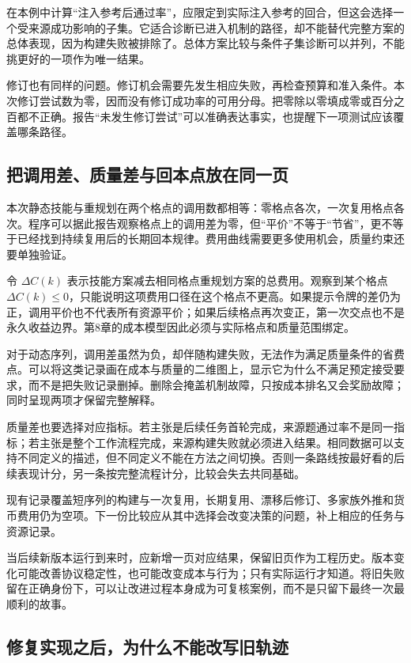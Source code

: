 在本例中计算“注入参考后通过率”，应限定到实际注入参考的回合，但这会选择一个受来源成功影响的子集。它适合诊断已进入机制的路径，却不能替代完整方案的总体表现，因为构建失败被排除了。总体方案比较与条件子集诊断可以并列，不能挑更好的一项作为唯一结果。

修订也有同样的问题。修订机会需要先发生相应失败，再检查预算和准入条件。本次修订尝试数为零，因而没有修订成功率的可用分母。把零除以零填成零或百分之百都不正确。报告“未发生修订尝试”可以准确表达事实，也提醒下一项测试应该覆盖哪条路径。

\subsection{把调用差、质量差与回本点放在同一页}
\label{sec:ch15-costqualitypage}

本次静态技能与重规划在两个格点的调用数都相等：零格点各次，一次复用格点各次。程序可以据此报告观察格点上的调用差为零，但“平价”不等于“节省”，更不等于已经找到持续复用后的长期回本规律。费用曲线需要更多使用机会，质量约束还要单独验证。

令 $\Delta C(k)$ 表示技能方案减去相同格点重规划方案的总费用。观察到某个格点 $\Delta C(k)\leq0$，只能说明这项费用口径在这个格点不更高。如果提示令牌的差仍为正，调用平价也不代表所有资源平价；如果后续格点再次变正，第一次交点也不是永久收益边界。第8章的成本模型因此必须与实际格点和质量范围绑定。

对于动态序列，调用差虽然为负，却伴随构建失败，无法作为满足质量条件的省费点。可以将这类记录画在成本与质量的二维图上，显示它为什么不满足预定接受要求，而不是把失败记录删掉。删除会掩盖机制故障，只按成本排名又会奖励故障；同时呈现两项才保留完整解释。

质量差也要选择对应指标。若主张是后续任务首轮完成，来源题通过率不是同一指标；若主张是整个工作流程完成，来源构建失败就必须进入结果。相同数据可以支持不同定义的描述，但不同定义不能在方法之间切换。否则一条路线按最好看的后续表现计分，另一条按完整流程计分，比较会失去共同基础。

现有记录覆盖短序列的构建与一次复用，长期复用、漂移后修订、多家族外推和货币费用仍为空项。下一份比较应从其中选择会改变决策的问题，补上相应的任务与资源记录。

当后续新版本运行到来时，应新增一页对应结果，保留旧页作为工程历史。版本变化可能改善协议稳定性，也可能改变成本与行为；只有实际运行才知道。将旧失败留在正确身份下，可以让改进过程本身成为可复核案例，而不是只留下最终一次最顺利的故事。


\subsection{修复实现之后，为什么不能改写旧轨迹}
\label{sec:ch15-versionseparation}

